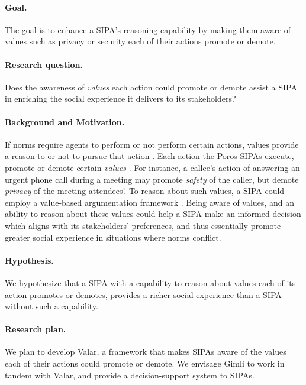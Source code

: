 \documentclass[11pt,          %
               phd,           %
               onehalfspacing %
               ]{ncsuthesis}
\newcommand{\fsl}{\textsl}
\newcommand{\frameworkB}{Poros\xspace}
\newcommand{\frameworkC}{Valar\xspace}
\newcommand{\frameworkD}{Gimli\xspace}
\begin{document}
\paragraph*{Goal.} The goal is to enhance a SIPA's reasoning capability
by making them aware of values such as privacy or security each of their 
actions promote or demote.

\paragraph*{Research question.} Does the awareness of \fsl{values} each
action could promote or demote assist a SIPA in enriching the social
experience it delivers to its stakeholders?

\paragraph*{Background and Motivation.} 
If norms require agents to perform or not perform certain actions,
values provide a reason to or not to pursue that action
\citep{Dechesne-AIL13-Norms+Values}. Each action the \frameworkB SIPAs
execute, promote or demote certain \fsl{values}
\citep{pasotti-2016-normas}. For instance, a callee's action of
answering an urgent phone call during a meeting may promote \fsl{safety}
of the caller, but demote \fsl{privacy} of the meeting attendees'. To
reason about such values, a SIPA could employ a value-based
argumentation framework \citep{BenchCapon-2003-Persuasion}. Being aware
of values, and an ability to reason about these values could help a SIPA
make an informed decision which aligns with its stakeholders'
preferences, and thus essentially promote greater social experience in
situations where norms conflict.

\paragraph*{Hypothesis.} We hypothesize that a SIPA with a capability to
reason about values each of its action promotes or demotes, provides a
richer social experience than a SIPA without such a capability.

\paragraph*{Research plan.}

We plan to develop \frameworkC, a framework that makes SIPAs aware of
the values each of their actions could promote or demote. We envisage
\frameworkD to work in tandem with \frameworkC, and provide a
decision-support system to SIPAs.
\end{document}
